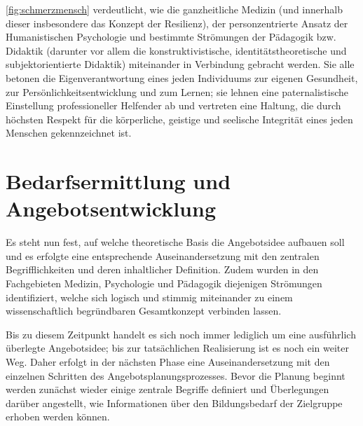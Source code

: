 \documentclass[
  twoside,
  parskip=half-,
]{scrreprt}
\begin{document}
\autoref{fig:schmerzmensch} verdeutlicht, wie die ganzheitliche Medizin (und innerhalb dieser insbesondere das Konzept der Resilienz), der personzentrierte Ansatz der Humanistischen Psychologie und bestimmte Strömungen der Pädagogik bzw. Didaktik (darunter vor allem die konstruktivistische, identitätstheoretische und subjektorientierte Didaktik) miteinander in Verbindung gebracht werden. Sie alle betonen die Eigenverantwortung eines jeden Individuums zur eigenen Gesundheit, zur Persönlichkeitsentwicklung und zum Lernen; sie lehnen eine paternalistische Einstellung professioneller Helfender ab und vertreten eine Haltung, die durch höchsten Respekt für die körperliche, geistige und seelische Integrität eines jeden Menschen gekennzeichnet ist. 

\chapter{Bedarfsermittlung und Angebotsentwicklung}

Es steht nun fest, auf welche theoretische Basis die Angebotsidee aufbauen soll und es erfolgte eine entsprechende Auseinandersetzung mit den zentralen Begrifflichkeiten und deren inhaltlicher Definition. Zudem wurden in den Fachgebieten Medizin, Psychologie und Pädagogik diejenigen Strömungen identifiziert, welche sich logisch und stimmig miteinander zu einem wissenschaftlich begründbaren Gesamtkonzept verbinden lassen.

Bis zu diesem Zeitpunkt handelt es sich noch immer lediglich um eine ausführlich überlegte Angebotsidee; bis zur tatsächlichen Realisierung ist es noch ein weiter Weg. Daher erfolgt in der nächsten Phase eine Auseinandersetzung mit den einzelnen Schritten des Angebotsplanungsprozesses. Bevor die Planung beginnt werden zunächst wieder einige zentrale Begriffe definiert und Überlegungen darüber angestellt, wie Informationen über den Bildungsbedarf der Zielgruppe erhoben werden können.
\end{document}
